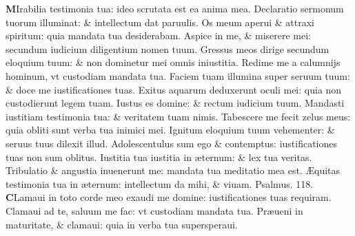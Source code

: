 \documentclass[a5paper,10pt]{book}
\def\ae{æ}
\def\AE{Æ}
\begin{document}
\begin{multicols*}{2}
\lettrine[lines=2]{\bfseries M}{}Irabilia testimonia tua: ideo scrutata est ea anima mea.
\newline \color{red} D\color{black}eclaratio sermonum tuorum illuminat: \& intellectum dat paruulis.
\newline \color{red} O\color{black}s meum aperui \& attraxi spiritum: quia mandata tua desiderabam.
\newline \color{red} A\color{black}spice in me, \& miserere mei: secundum iudicium diligentium nomen tuum.
\newline \color{red} G\color{black}ressus meos dirige secundum eloquium tuum: \& non dominetur mei omnis iniustitia.
\newline \color{red} R\color{black}edime me a calumnijs hominum, vt custodiam mandata tua.
\newline \color{red} F\color{black}aciem tuam illumina super seruum tuum: \& doce me iustificationes tuas.
\newline \color{red} E\color{black}xitus aquarum deduxerunt oculi mei: quia non custodierunt legem tuam.
\newline \color{red} I\color{black}ustus es domine: \& rectum iudicium tuum.
\newline \color{red} M\color{black}andasti iustitiam testimonia tua: \& veritatem tuam nimis.
\newline \color{red} T\color{black}abescere me fecit zelus meus: quia obliti sunt verba tua inimici mei.
\newline \color{red} I\color{black}gnitum eloquium tuum vehementer: \& seruus tuus dilexit illud.
\newline \color{red} A\color{black}dolescentulus sum ego \& contemptus: iustificationes tuas non sum oblitus.
\newline \color{red} I\color{black}ustitia tua iustitia in \ae ternum: \& lex tua veritas.
\newline \color{red} T\color{black}ribulatio \& angustia inuenerunt me: mandata tua meditatio mea est.
\newline \color{red} \AE \color{black}quitas testimonia tua in \ae ternum: intellectum da mihi, \& viuam. \quad \color{red} Psalmus. \hypertarget{ps118.10}{118.} \color{black}
\vspace{-.5em}
\lettrine[lines=2]{\bfseries \color{red} C}{}Lamaui in toto corde meo exaudi me domine: iustificationes tuas requiram.
\newline \color{red} C\color{black}lamaui ad te, saluum me fac: vt custodiam mandata tua.
\newline \color{red} P\color{black}r\ae ueni in maturitate, \& clamaui: quia in verba tua supersperaui.

\end{multicols*}
\end{document}
